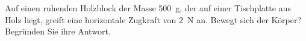 
\begin{aufgabe}
	Auf einen ruhenden Holzblock der Masse \SI{500}{g}, der auf einer Tischplatte aus Holz liegt, greift eine horizontale Zugkraft von \SI{2}{N} an.
	Bewegt sich der Körper? Begründen Sie ihre Antwort.
\end{aufgabe}

